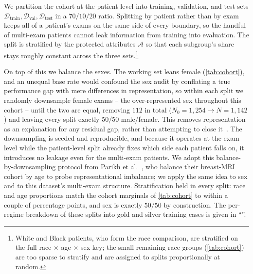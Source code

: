We partition the cohort at the patient level into training, validation, and test
sets $\mathcal{D}_{\mathrm{train}}, \mathcal{D}_{\mathrm{val}},
\mathcal{D}_{\mathrm{test}}$ in a $70/10/20$ ratio. Splitting by patient rather
than by exam keeps all of a patient's exams on the same side of every boundary,
so the handful of multi-exam patients cannot leak information from training into
evaluation. The split is stratified by the protected attributes $\mathcal{A}$
so that each subgroup's share stays roughly constant across
the three sets.\footnote{White and Black patients, who form the race comparison,
are stratified on the full race $\times$ age $\times$ sex key; the small
remaining race groups (\autoref{tab:cohort}) are too sparse to stratify and are
assigned to splits proportionally at random.}

On top of this we balance the sexes. The working set leans female
(\autoref{tab:cohort}), and an unequal base rate would confound the sex audit by
conflating a true performance gap with mere differences in representation, so
within each split we randomly downsample female exams -- the over-represented sex
throughout this cohort -- until the two are equal, removing $112$ in total
($N_0 = 1{,}254 \to N = 1{,}142$) and leaving every split exactly $50/50$
male/female. This removes representation as an explanation for any residual gap,
rather than attempting to close it~\cite{parikh2025labelbias}. The downsampling is seeded
and reproducible, and because it operates at the exam level while the
patient-level split already fixes which side each patient falls on, it introduces
no leakage even for the multi-exam patients. We adopt this balance-by-downsampling
protocol from Parikh et al.~\cite{parikh2025labelbias,parikh2025whofails}, who
balance their breast-MRI cohort by age to probe representational imbalance; we
apply the same idea to sex and to this dataset's multi-exam structure.
Stratification held in every split: race and age proportions match the cohort
marginals of \autoref{tab:cohort} to within a couple of percentage points, and
sex is exactly $50/50$ by construction. The
per-regime breakdown of these splits into gold and silver training cases is given
in ``''.

